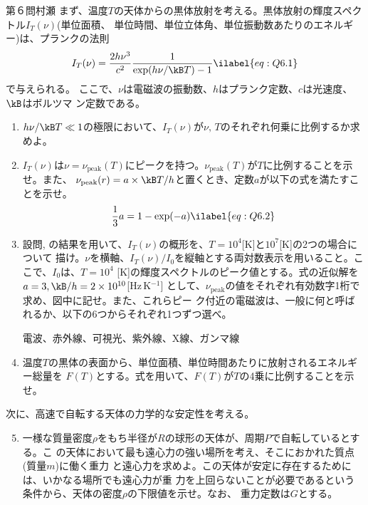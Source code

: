 \begin{question}{第６問}{村瀬}
まず、温度$T$の天体からの黒体放射を考える。黒体放射の輝度スペクトル$I_T(\nu)$(単位面積、
単位時間、単位立体角、単位振動数あたりのエネルギー)は、プランクの法則
\begin{align}
  I_T(\nu) = \frac{2h\nu^3}{c^2}\frac1{\exp(h\nu/\kB T)-1} \ilabel{eq:Q6.1}
\end{align}
で与えられる。
ここで、$\nu$は電磁波の振動数、$h$はプランク定数、$c$は光速度、$\kB$はボルツマ
ン定数である。
\begin{enumerate}
\item{}
  $h\nu/\kB T\ll1$の極限において、$I_T(\nu)$が$\nu,\,T$のそれぞれ何乗に比例するか求めよ。
\item{}
  $I_T(\nu)$は$\nu=\nu_\mathrm{peak}(T)$にピークを持つ。$\nu_\mathrm{peak}(T)$が$T$に比例することを示せ。また、
  $\nu_\mathrm{peak}(r)=a\times\kB T/h$と置くとき、定数$a$が以下の式を満たすことを示せ。
  \begin{align}
    \frac13a=1-\exp(-a) \ilabel{eq:Q6.2}
  \end{align}
\item
  設問, の結果を用いて、$I_T(\nu)$の概形を、$T=10^4$[K]と$10^7$[K]の2つの場合について
  描け。$\nu$を横軸、$I_T(\nu)/I_0$を縦軸とする両対数表示を用いること。ここで、$I_0$は、$T=10^4$
  [K]の輝度スペクトルのピーク値とする。式の近似解を$a=3,\kB/h=2\times 10^{10}$[Hz\,K$^{-1}$]
  として、$\nu_\mathrm{peak}$の値をそれぞれ有効数字1桁で求め、図中に記せ。また、これらピー
  ク付近の電磁波は、一般に何と呼ばれるか、以下の6つからそれぞれ1つずつ選べ。
  \begin{center}
  電波、赤外線、可視光、紫外線、X線、ガンマ線
  \end{center}
\item{}
  温度$T$の黒体の表面から、単位面積、単位時間あたりに放射されるエネルギー総量を
  $F(T)$とする。式を用いて、$F(T)$が$T$の4乗に比例することを示せ。
\end{enumerate}
次に、高速で自転する天体の力学的な安定性を考える。
\begin{enumerate}
\setcounter{enumi}{4}
\item{}
  一様な質量密度$\rho$をもち半径が$R$の球形の天体が、周期$P$で自転しているとする。こ
  の天体において最も遠心力の強い場所を考え、そこにおかれた質点(質量$m$)に働く重力
  と遠心力を求めよ。この天体が安定に存在するためには、いかなる場所でも遠心力が重
  力を上回らないことが必要であるという条件から、天体の密度$\rho$の下限値を示せ。なお、
  重力定数は$G$とする。
\end{enumerate}

\end{question}
